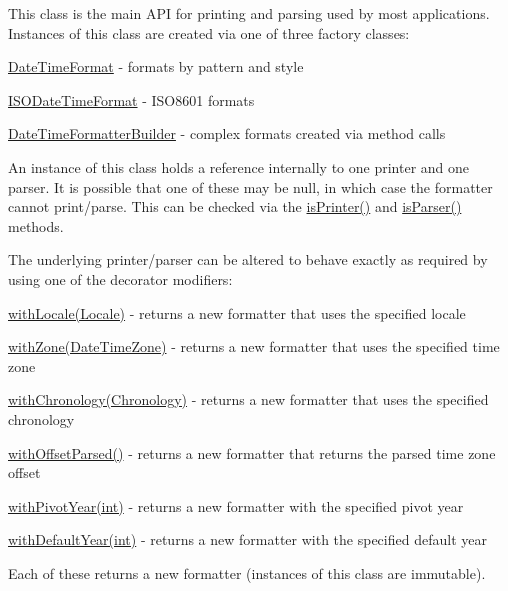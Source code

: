 This class is the main A\-P\-I for printing and parsing used by most applications. Instances of this class are created via one of three factory classes\-: 
\begin{DoxyItemize}
\item \hyperlink{classorg_1_1joda_1_1time_1_1format_1_1_date_time_format}{Date\-Time\-Format} -\/ formats by pattern and style 
\item \hyperlink{classorg_1_1joda_1_1time_1_1format_1_1_i_s_o_date_time_format}{I\-S\-O\-Date\-Time\-Format} -\/ I\-S\-O8601 formats 
\item \hyperlink{classorg_1_1joda_1_1time_1_1format_1_1_date_time_formatter_builder}{Date\-Time\-Formatter\-Builder} -\/ complex formats created via method calls 
\end{DoxyItemize}

An instance of this class holds a reference internally to one printer and one parser. It is possible that one of these may be null, in which case the formatter cannot print/parse. This can be checked via the \hyperlink{classorg_1_1joda_1_1time_1_1format_1_1_date_time_formatter_a0183475e5e212d4b05a96803d97e2960}{is\-Printer()} and \hyperlink{classorg_1_1joda_1_1time_1_1format_1_1_date_time_formatter_ac896f659a5b4a7e832005a424d25beb9}{is\-Parser()} methods. 

The underlying printer/parser can be altered to behave exactly as required by using one of the decorator modifiers\-: 
\begin{DoxyItemize}
\item \hyperlink{classorg_1_1joda_1_1time_1_1format_1_1_date_time_formatter_a21ca0f007de491595b86838104b6df01}{with\-Locale(\-Locale)} -\/ returns a new formatter that uses the specified locale 
\item \hyperlink{classorg_1_1joda_1_1time_1_1format_1_1_date_time_formatter_ad41dd94d1554f1cf04f93b1a1df4d31d}{with\-Zone(\-Date\-Time\-Zone)} -\/ returns a new formatter that uses the specified time zone 
\item \hyperlink{classorg_1_1joda_1_1time_1_1format_1_1_date_time_formatter_a8a09e9172eb85866ffd62379cbf0e6ba}{with\-Chronology(\-Chronology)} -\/ returns a new formatter that uses the specified chronology 
\item \hyperlink{classorg_1_1joda_1_1time_1_1format_1_1_date_time_formatter_a0d5de6b63763b30a6c856bb38fd0f18d}{with\-Offset\-Parsed()} -\/ returns a new formatter that returns the parsed time zone offset 
\item \hyperlink{classorg_1_1joda_1_1time_1_1format_1_1_date_time_formatter_a19a3eb2509505116c67af33d8318214a}{with\-Pivot\-Year(int)} -\/ returns a new formatter with the specified pivot year 
\item \hyperlink{classorg_1_1joda_1_1time_1_1format_1_1_date_time_formatter_a7ba9bb6d21f67d3f1a223802d4d83aeb}{with\-Default\-Year(int)} -\/ returns a new formatter with the specified default year 
\end{DoxyItemize}Each of these returns a new formatter (instances of this class are immutable). 

